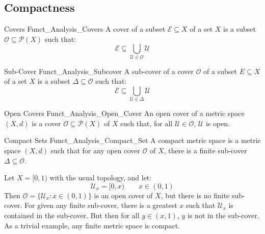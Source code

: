 \documentclass[crop=false,class=book,oneside]{standalone}                      %
\begin{document}
        \subsection{Compactness}
            \begin{ldefinition}{Covers}
                  {Funct_Analysis_Covers}
                A cover of a subset $\mathcal{E}\subseteq{X}$ of
                a set $X$ is a subset
                $\mathcal{O}\subseteq\mathcal{P}(X)$ such that:
                \begin{equation}
                    \mathcal{E}\subseteq
                    \bigcup_{\mathcal{U}\in\mathcal{O}}
                        \mathcal{U}
                \end{equation}
            \end{ldefinition}
            \begin{ldefinition}{Sub-Cover}
                  {Funct_Analysis_Subcover}
                A sub-cover of a cover $\mathcal{O}$ of a subset
                $E\subseteq{X}$ of a set $X$ is a subset
                $\Delta\subseteq\mathcal{O}$ such that:
              \begin{equation}
                    \mathcal{E}\subseteq
                    \bigcup_{\mathcal{U}\in\Delta}
                        \mathcal{U}
                \end{equation}
            \end{ldefinition}
            \begin{ldefinition}{Open Covers}
                  {Funct_Analysis_Open_Cover}
                An open cover of a metric space $(X,d)$ is a cover
                $\mathcal{O}\subseteq\mathcal{P}(X)$ of $X$ such
                that, for all $\mathcal{U}\in\mathcal{O}$,
                $\mathcal{U}$ is open.
            \end{ldefinition}
            \begin{ldefinition}{Compact Sets}
                  {Funct_Analysis_Compact_Set}
                A compact metric space is a metric space $(X,d)$
                such that for any open cover $\mathcal{O}$ of
                $X$, there is a finite
                sub-cover $\Delta\subseteq\mathcal{O}$.
            \end{ldefinition}
            \begin{lexample}
                Let $X=[0,1)$ with the usual topology, and let:
                \begin{equation}
                    \mathcal{U}_{x}=[0,x)
                    \quad\quad
                    x\in(0,1)
                \end{equation}
                Then $\mathcal{O}=\{\mathcal{U}_{x}:x\in(0,1)\}$
                is an open cover of $X$, but there is no finite
                sub-cover. For given any finite sub-cover,
                there is a greatest $x$ such that
                $\mathcal{U}_{x}$ is contained in the sub-cover.
                But then for all $y\in(x,1)$, $y$ is not in
                the sub-cover. As a trivial example, any
                finite metric space is compact.
            \end{lexample}
\end{document}
